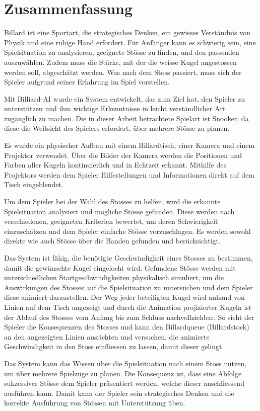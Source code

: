 \chapter{Zusammenfassung}
Billard ist eine Sportart, die strategisches Denken, ein gewisses Verständnis von Physik und eine ruhige Hand erfordert.
Für Anfänger kann es schwierig sein, eine Spielsituation zu analysieren, geeignete Stösse zu finden, und den passenden auszuwählen.
Zudem muss die Stärke, mit der die weisse Kugel angestossen werden soll, abgeschätzt werden.
Was nach dem Stoss passiert, muss sich der Spieler aufgrund seiner Erfahrung im Spiel vorstellen.

Mit Billiard-AI wurde ein System entwickelt, das zum Ziel hat, den Spieler zu unterstützen und ihm wichtige Erkenntnisse
in leicht verständlicher Art zugänglich zu machen.
Die in dieser Arbeit betrachtete Spielart ist Snooker, da diese die Weitsicht des Spielers erfordert, über mehrere Stösse zu planen.

Es wurde ein physischer Aufbau mit einem Billardtisch, einer Kamera und einem Projektor verwendet.
Über die Bilder der Kamera werden die Positionen und Farben aller Kugeln kontinuierlich und in Echtzeit erkannt.
Mithilfe des Projektors werden dem Spieler Hilfestellungen und Informationen direkt auf dem Tisch eingeblendet.

Um dem Spieler bei der Wahl des Stosses zu helfen, wird die erkannte Spielsituation analysiert und mögliche Stösse gefunden.
Diese werden nach verschiedenen, geeigneten Kriterien bewertet, um deren Schwierigkeit einzuschätzen und dem Spieler
einfache Stösse vorzuschlagen.
Es werden sowohl direkte wie auch Stösse über die Banden gefunden und berücksichtigt.

Das System ist fähig, die benötigte Geschwindigkeit eines Stosses zu bestimmen, damit die gewünschte Kugel eingelocht wird.
Gefundene Stösse werden mit unterschiedlichen Startgeschwindigkeiten physikalisch simuliert, um die Auswirkungen
des Stosses auf die Spielsituation zu untersuchen und dem Spieler diese animiert darzustellen.
Der Weg jeder beteiligten Kugel wird anhand von Linien auf dem Tisch angezeigt und durch die Animation projizierter Kugeln
ist der Ablauf des Stosses vom Anfang bis zum Schluss nachvollziehbar.
So sieht der Spieler die Konsequenzen des Stosses und kann den Billardqueue (Billardstock) an den angezeigten Linien ausrichten
und versuchen, die animierte Geschwindigkeit in den Stoss einfliessen zu lassen, damit dieser gelingt.

Das System kann das Wissen über die Spielsituation nach einem Stoss nutzen, um über mehrere Spielzüge zu planen.
Die Konsequenz ist, dass eine Abfolge sukzessiver Stösse dem Spieler präsentiert werden, welche dieser anschliessend
ausführen kann.
Damit kann der Spieler sein strategisches Denken und die korrekte Ausführung von Stössen mit Unterstützung üben.

